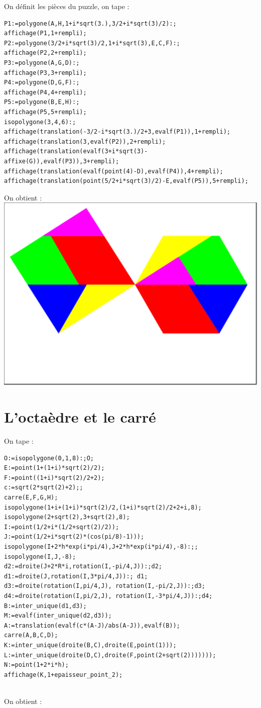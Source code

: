 \documentclass[a4paper,11pt]{book}
\begin{document}
On d\'efinit les pi\`eces du puzzle, on tape :
\begin{verbatim}
P1:=polygone(A,H,1+i*sqrt(3.),3/2+i*sqrt(3)/2):;
affichage(P1,1+rempli);
P2:=polygone(3/2+i*sqrt(3)/2,1+i*sqrt(3),E,C,F):;
affichage(P2,2+rempli);
P3:=polygone(A,G,D):;
affichage(P3,3+rempli);
P4:=polygone(D,G,F):;
affichage(P4,4+rempli);
P5:=polygone(B,E,H):;
affichage(P5,5+rempli);
isopolygone(3,4,6):;
affichage(translation(-3/2-i*sqrt(3.)/2+3,evalf(P1)),1+rempli);
affichage(translation(3,evalf(P2)),2+rempli);
affichage(translation(evalf(3+i*sqrt(3)-affixe(G)),evalf(P3)),3+rempli);
affichage(translation(evalf(point(4)-D),evalf(P4)),4+rempli);
affichage(translation(point(5/2+i*sqrt(3)/2)-E,evalf(P5)),5+rempli);
\end{verbatim}
On obtient :\\
\includegraphics[width=\textwidth]{puzzlehex1}
\section{L'octa\`edre et le carr\'e}
On tape :
\begin{verbatim}
O:=isopolygone(0,1,8):;O;
E:=point(1+(1+i)*sqrt(2)/2);
F:=point((1+i)*sqrt(2)/2+2);
c:=sqrt(2*sqrt(2)+2);;
carre(E,F,G,H);
isopolygone(1+i+(1+i)*sqrt(2)/2,(1+i)*sqrt(2)/2+2+i,8);
isopolygone(2+sqrt(2),3+sqrt(2),8);
I:=point(1/2+i*(1/2+sqrt(2)/2));
J:=point(1/2+i*sqrt(2)*(cos(pi/8)-1)));
isopolygone(I+2*h*exp(i*pi/4),J+2*h*exp(i*pi/4),-8):;;
isopolygone(I,J,-8);
d2:=droite(J+2*R*i,rotation(I,-pi/4,J)):;d2;
d1:=droite(J,rotation(I,3*pi/4,J)):; d1;
d3:=droite(rotation(I,pi/4,J), rotation(I,-pi/2,J)):;d3;
d4:=droite(rotation(I,pi/2,J), rotation(I,-3*pi/4,J)):;d4;
B:=inter_unique(d1,d3);
M:=evalf(inter_unique(d2,d3));
A:=translation(evalf(c*(A-J)/abs(A-J)),evalf(B));
carre(A,B,C,D);
K:=inter_unique(droite(B,C),droite(E,point(1)));
L:=inter_unique(droite(D,C),droite(F,point(2+sqrt(2)))))));
N:=point(1+2*i*h);
affichage(K,1+epaisseur_point_2);


\end{verbatim}
On obtient :\\
\end{document}
